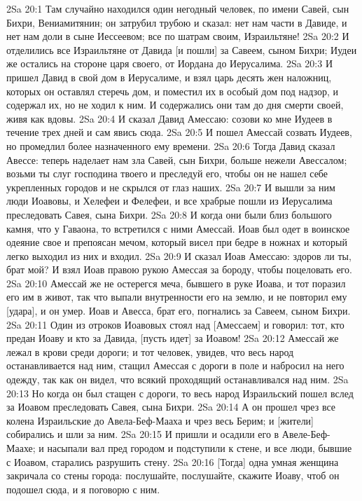 2Sa 20:1  Там случайно находился один негодный человек, по имени Савей, сын Бихри, Вениамитянин; он затрубил трубою и сказал: нет нам части в Давиде, и нет нам доли в сыне Иессеевом; все по шатрам своим, Израильтяне!
2Sa 20:2  И отделились все Израильтяне от Давида [и пошли] за Савеем, сыном Бихри; Иудеи же остались на стороне царя своего, от Иордана до Иерусалима.
2Sa 20:3  И пришел Давид в свой дом в Иерусалиме, и взял царь десять жен наложниц, которых он оставлял стеречь дом, и поместил их в особый дом под надзор, и содержал их, но не ходил к ним. И содержались они там до дня смерти своей, живя как вдовы.
2Sa 20:4  И сказал Давид Амессаю: созови ко мне Иудеев в течение трех дней и сам явись сюда.
2Sa 20:5  И пошел Амессай созвать Иудеев, но промедлил более назначенного ему времени.
2Sa 20:6  Тогда Давид сказал Авессе: теперь наделает нам зла Савей, сын Бихри, больше нежели Авессалом; возьми ты слуг господина твоего и преследуй его, чтобы он не нашел себе укрепленных городов и не скрылся от глаз наших.
2Sa 20:7  И вышли за ним люди Иоавовы, и Хелефеи и Фелефеи, и все храбрые пошли из Иерусалима преследовать Савея, сына Бихри.
2Sa 20:8  И когда они были близ большого камня, что у Гаваона, то встретился с ними Амессай. Иоав был одет в воинское одеяние свое и препоясан мечом, который висел при бедре в ножнах и который легко выходил из них и входил.
2Sa 20:9  И сказал Иоав Амессаю: здоров ли ты, брат мой? И взял Иоав правою рукою Амессая за бороду, чтобы поцеловать его.
2Sa 20:10  Амессай же не остерегся меча, бывшего в руке Иоава, и тот поразил его им в живот, так что выпали внутренности его на землю, и не повторил ему [удара], и он умер. Иоав и Авесса, брат его, погнались за Савеем, сыном Бихри.
2Sa 20:11  Один из отроков Иоавовых стоял над [Амессаем] и говорил: тот, кто предан Иоаву и кто за Давида, [пусть идет] за Иоавом!
2Sa 20:12  Амессай же лежал в крови среди дороги; и тот человек, увидев, что весь народ останавливается над ним, стащил Амессая с дороги в поле и набросил на него одежду, так как он видел, что всякий проходящий останавливался над ним.
2Sa 20:13  Но когда он был стащен с дороги, то весь народ Израильский пошел вслед за Иоавом преследовать Савея, сына Бихри.
2Sa 20:14  А он прошел чрез все колена Израильские до Авела-Беф-Мааха и чрез весь Берим; и [жители] собирались и шли за ним.
2Sa 20:15  И пришли и осадили его в Авеле-Беф-Маахе; и насыпали вал пред городом и подступили к стене, и все люди, бывшие с Иоавом, старались разрушить стену.
2Sa 20:16  [Тогда] одна умная женщина закричала со стены города: послушайте, послушайте, скажите Иоаву, чтоб он подошел сюда, и я поговорю с ним.
